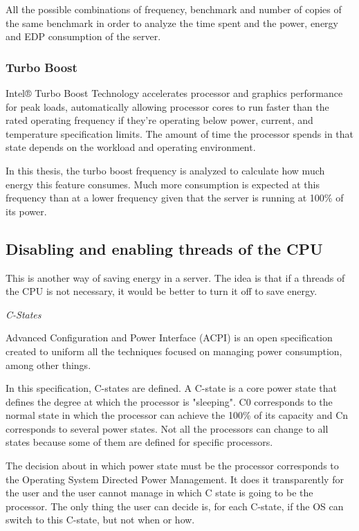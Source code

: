 All the possible combinations of frequency, benchmark and number of copies of the same benchmark in order to analyze the time spent and the power, energy and EDP consumption of the server.


\subsubsection{Turbo Boost}

Intel® Turbo Boost Technology accelerates processor and graphics performance for peak loads, automatically allowing processor cores to run faster than the rated operating frequency if they’re operating below power, current, and temperature specification limits. The amount of time the processor spends in that state depends on the workload and operating environment.

In this thesis, the turbo boost frequency is analyzed to calculate how much energy this feature consumes. Much more consumption is expected at this frequency than at a lower frequency given that the server is running at 100\% of its power.



\subsection{Disabling and enabling threads of the CPU}

This is another way of saving energy in a server. The idea is that if a threads of the CPU is not necessary, it would be better to turn it off to save energy.

\emph{C-States}

Advanced Configuration and Power Interface (ACPI) is an open specification created to uniform all the techniques focused on managing power consumption, among other things.

In this specification, C-states are defined. A C-state is a core power state that defines the degree at which the processor is "sleeping". C0 corresponds to the normal state in which the processor can achieve the 100\% of its capacity and Cn corresponds to several power states. Not all the processors can change to all states because some of them are defined for specific processors.

The decision about in which power state must be the processor corresponds to the Operating System Directed Power Management. It does it transparently for the user and the user cannot manage in which C state is going to be the processor. The only thing the user can decide is, for each C-state, if the OS can switch to this C-state, but not when or how.

